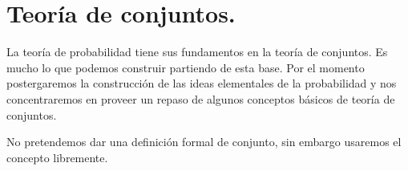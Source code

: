 \documentclass[14pt]{extbook}
\begin{document}
\chapter{Teoría de conjuntos.}

La teoría de probabilidad tiene sus fundamentos en la teoría de conjuntos. Es mucho lo que podemos construir partiendo de esta base. Por el momento postergaremos la construcción de las ideas elementales de la probabilidad y nos concentraremos en proveer un repaso de algunos conceptos básicos de teoría de conjuntos.

No pretendemos dar una definición formal de conjunto, sin embargo usaremos el concepto libremente. 
\end{document}
